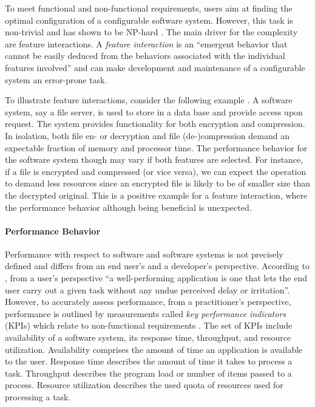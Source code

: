 To meet functional and non-functional requirements, users aim at finding the
optimal configuration of a configurable software system. However, this task is
non-trivial and has shown to be NP-hard \citep{white_selecting_2009}. The main
driver for the complexity are feature interactions. A \emph{feature
interaction} is an ``emergent behavior that cannot be easily deduced from the
behaviors associated with the individual features involved''
\citep{apel_feature-oriented_2013} and can make development and maintenance of
a configurable system an error-prone task.

To illustrate feature interactions, consider the following example
\citep{siegmund_performance-influence_2015}. A software system, say a file
server, is used to store in a data base and provide access upon request. The
system provides functionality for both encryption and compression. In
isolation, both file en- or decryption and file (de-)compression demand an
expectable fraction of memory and processor time. The performance behavior for
the software system though may vary if both features are selected. For
instance, if a file is encrypted and compressed (or vice versa), we can expect
the operation to demand less resources since an encrypted file is likely to be
of smaller size than the decrypted original.
This is a positive example for a feature interaction, where the performance
behavior although being beneficial is unexpected.

\paragraph{Performance Behavior}
Performance with respect to software and software systems is not
precisely defined and differs from an end user's and a developer’s perspective.
According to \cite{molyneaux_art_2014}, from a user’s perspective ``a well-performing
application is one that lets the end user carry out a given task without any
undue perceived delay or irritation''. However, to accurately assess
performance, from a practitioner’s perspective, performance is outlined by
measurements called \emph{key performance indicators} (KPIs) which relate to
non-functional requirements \citep{molyneaux_art_2014}. The set of KPIs include
availability of a software system, its response time, throughput, and resource
utilization. Availability comprises the amount of time an application is
available to the user. Response time describes the amount of time it takes to
process a task. Throughput describes the program load or number of items passed
to a process. Resource utilization describes the used quota of resources used
for processing a task.

